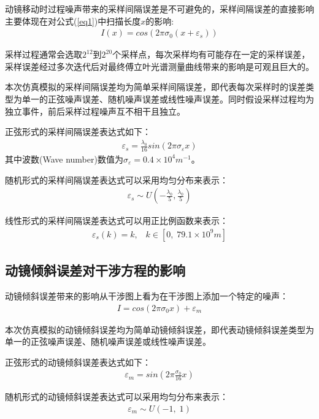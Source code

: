 \documentclass[conference]{IEEEtran}
\begin{document}
动镜移动时过程噪声带来的采样间隔误差是不可避免的，采样间隔误差的直接影响主要体现在对公式(\ref{eq1})中扫描长度$x$的影响:
\begin{align}
    I(x) = cos(2\pi\sigma_0(x + \varepsilon_s)) \label{eq9}
\end{align}

采样过程通常会选取$2^{12}$到$2^{20}$个采样点，每次采样均有可能存在一定的采样误差，采样误差经过多次迭代后对最终傅立叶光谱测量曲线带来的影响是可观且巨大的。

本次仿真模拟的采样间隔误差均为简单采样间隔误差，即代表每次采样时的误差类型为单一的正弦噪声误差、随机噪声误差或线性噪声误差。同时假设采样过程均为独立事件，前后采样过程噪声互不相干且独立。

正弦形式的采样间隔误差表达式如下：
\begin{align}
    \varepsilon_s = \frac{\lambda_0}{16}sin(2\pi\sigma_{\varepsilon}x)  \label{eq2}
\end{align}
其中波数(Wave number)数值为$\sigma_{\varepsilon} = 0.4\times10^4 m^{-1}$。

随机形式的采样间隔误差表达式可以采用均匀分布来表示：
\begin{align}
    \varepsilon_s \sim U(-\frac{\lambda_0}{5}, \frac{\lambda_0}{5})   \label{eq3}
\end{align}

线性形式的采样间隔误差表达式可以用正比例函数来表示：
\begin{align}
    \varepsilon_s(k) = k, \;\;\; k \in [0, \;79.1\times10^9 m] \label{eq4}
\end{align}

\subsection{动镜倾斜误差对干涉方程的影响}
动镜倾斜误差带来的影响从干涉图上看为在干涉图上添加一个特定的噪声：
\begin{align}
    I = cos(2\pi\sigma_0x) + \varepsilon_m \label{eq5}
\end{align}

本次仿真模拟的动镜倾斜误差均为简单动镜倾斜误差，即代表动镜倾斜误差类型为单一的正弦噪声误差、随机噪声误差或线性噪声误差。

正弦形式的动镜倾斜误差表达式如下：
\begin{align}
    \varepsilon_m = sin(2\pi\frac{\sigma_0}{16}x)  \label{eq6}
\end{align}

随机形式的动镜倾斜误差表达式可以采用均匀分布来表示：
\begin{align}
    \varepsilon_m \sim U(-1, \; 1)   \label{eq7}
\end{align}
\end{document}
